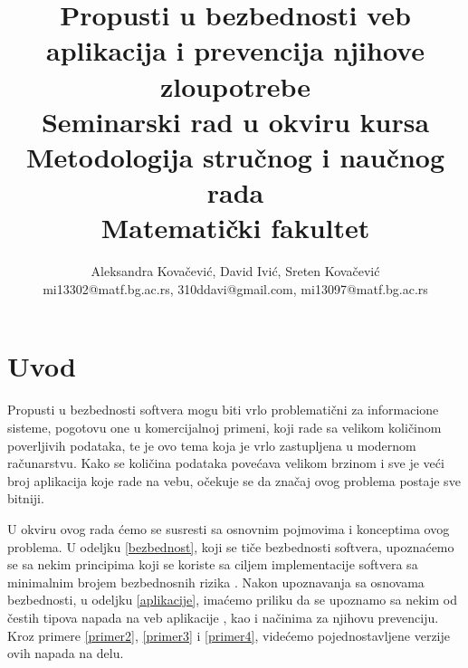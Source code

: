 \documentclass[a4paper]{article}
\begin{document}
\title{\vspace{-5ex}Propusti u bezbednosti veb aplikacija i prevencija njihove zloupotrebe\\ \small{Seminarski rad u okviru kursa\\Metodologija stručnog i naučnog rada\\ Matematički fakultet}}

\author{Aleksandra Kovačević, David Ivić, Sreten Kovačević\\ mi13302@matf.bg.ac.rs, 310ddavi@gmail.com, mi13097@matf.bg.ac.rs}

\maketitle


\tableofcontents

\newpage

\section{Uvod}

Propusti u bezbednosti softvera mogu biti vrlo problematični za informacione sisteme, pogotovu one u komercijalnoj primeni, koji rade sa velikom količinom poverljivih podataka, te je ovo tema koja je vrlo zastupljena u modernom računarstvu. Kako se količina podataka povećava velikom brzinom i sve je veći broj aplikacija koje rade na vebu, očekuje se da značaj ovog problema postaje sve bitniji.

U okviru ovog rada ćemo se susresti sa osnovnim pojmovima i konceptima ovog problema. U odeljku \ref{bezbednost}, koji se tiče bezbednosti softvera, upoznaćemo se sa nekim principima koji se koriste sa ciljem implementacije softvera sa minimalnim brojem bezbednosnih rizika \cite{BIS}. Nakon upoznavanja sa osnovama bezbednosti, u odeljku \ref{aplikacije}, imaćemo priliku da se upoznamo sa nekim od čestih tipova napada na veb aplikacije \cite{SQL, XSS, AC}, kao i načinima za njihovu prevenciju. Kroz primere \ref{primer2}, \ref{primer3} i \ref{primer4}, videćemo pojednostavljene verzije ovih napada na delu.
\end{document}
